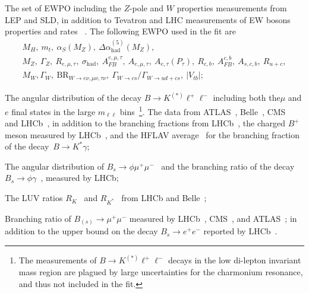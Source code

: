 \begin{itemize}
	\setlength\itemsep{0em}
	{\item The set of EWPO including the $Z$-pole and $W$ properties measurements from LEP and SLD, in addition to  Tevatron and LHC measurements of  EW bosons properties and rates ~\cite{ALEPH:2005ab,Abe:2000uc,Group:2012gb,Schael:2013ita,Aaboud:2017svj,Khachatryan:2014iya,Abazov:2011ws}. The following EWPO used in the fit are
		\begin{gather*}
			M_H,~m_t,~\alpha_S(M_Z),~\Delta \alpha_{\mathrm{had}}^{(5)}(M_Z),\\
			M_{Z},~\Gamma_{Z},~R_{e,\mu,\tau},~\sigma_{\mathrm{had}}, ~A^{e,\mu,\tau}_{FB},~A_{e,\mu,\tau},~A_{e,\tau}(P_\tau),~ R_{c,b},~A^{c,b}_{FB},~A_{s,c,b},~R_{u+c}, \\
			M_{W},\Gamma_{W},~\mathrm{BR}_{W\to e \nu,\mu \nu,\tau \nu},~\Gamma_{W\to cs}/\Gamma_{W\to ud+cs},~\left|V_{tb}\right|;
		\end{gather*}
	}
	\item The angular distribution of the decay $B\to K^{(*)}\ell^+\ell^-$ including both the$\mu$ and $e$ final states in the large $m_{\ell \ell}$ bins~\footnote{The measurements of  $B\to K^{(*)}\ell^+\ell^-$ decays in the low di-lepton invariant mass region are plagued by large uncertainties for the charmonium resonance, and thus not included in the fit.}.   The data from ATLAS~\cite{Aaboud:2018krd}, Belle~\cite{Wehle:2016yoi}, CMS~\cite{Khachatryan:2015isa,Sirunyan:2017dhj} and LHCb~\cite{Aaij:2015dea,Aaij:2020nrf}, in addition to the branching fractions from LHCb~\cite{Aaij:2016flj}, the charged $B^+$ meson measured by LHCb~\cite{Aaij:2014pli}, and the HFLAV average~\cite{Amhis:2019ckw} for the branching fraction of the decay~$B\to K^*\gamma$; 
	\item The angular distribution of $B_s\to \phi\mu^+\mu^-$~\cite{Aaij:2015esa} and the branching ratio of  the decay $B_s\to\phi\gamma$~\cite{Aaij:2012ita}, measured by LHCb;
	\item The LUV ratios $R_K$~\cite{Aaij:2019wad} and $R_{K^*}$~\cite{Aaij:2017vbb} from LHCb and Belle~\cite{Abdesselam:2019wac};
	\item Branching ratio of $B_{(s)}\to \mu^+\mu^-$ measured by LHCb~\cite{Aaij:2017vad}, CMS~\cite{Chatrchyan:2013bka}, and ATLAS~\cite{Aaboud:2018mst}; in addition to the upper bound on the decay $B_s\to e^+e^-$ reported by LHCb~\cite{Aaij:2020nol}. 
\end{itemize}
